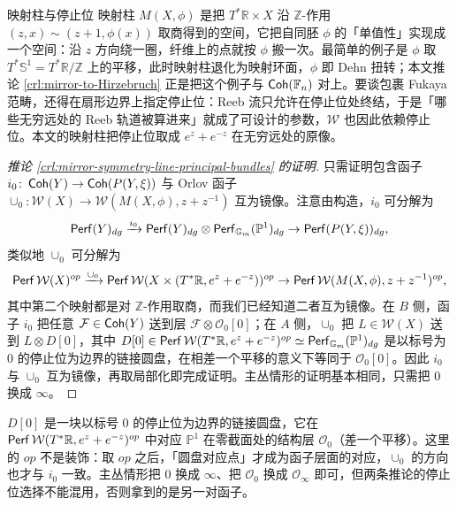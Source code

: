 \begin{conceptbox}{映射柱与停止位}
映射柱 $M(X,\phi)$ 是把 $T^{\ast}\mathbb{R}\times X$ 沿 $\mathbb{Z}$-作用 $(z,x)\sim(z+1,\phi (x))$ 取商得到的空间，它把自同胚 $\phi$ 的「单值性」实现成一个空间：沿 $z$ 方向绕一圈，纤维上的点就按 $\phi$ 搬一次。最简单的例子是 $\phi$ 取 $T^{\ast}\mathbb{S}^1=T^{\ast}\mathbb{R}/\mathbb{Z}$ 上的平移，此时映射柱退化为映射环面，$\phi$ 即 Dehn 扭转；本文推论 \ref{crl:mirror-to-Hirzebruch} 正是把这个例子与 $\operatorname{\mathsf{Coh}} (\mathbb{F}_n)$ 对上。要谈包裹 Fukaya 范畴，还得在扇形边界上指定停止位：Reeb 流只允许在停止位处终结，于是「哪些无穷远处的 Reeb 轨道被算进来」就成了可设计的参数，$\mathcal{W}$ 也因此依赖停止位。本文的映射柱把停止位取成 $e^z+e^{-z}$ 在无穷远处的原像。
\par\smallskip{}
\end{conceptbox}

\begin{proof}[推论 \ref{crl:mirror-symmetry-line-principal-bundles} 的证明]
    只需证明包含函子 $i_0\colon\operatorname{\mathsf{Coh}} (Y)\to\operatorname{\mathsf{Coh}} (P(Y,\xi))$ 与 Orlov 函子 $\cup_0\colon\mathcal{W} (X)\to\mathcal{W} (M(X,\phi),z+z^{-1})$ 互为镜像。注意由构造，$i_0$ 可分解为 \[
        \operatorname{\mathsf{Perf}} (Y)_{dg}\xrightarrow{i_0}\operatorname{\mathsf{Perf}} (Y)_{dg}\otimes\operatorname{\mathsf{Perf}}_{\mathbb{G}_m}(\mathbb{P}^1)_{dg}\to\operatorname{\mathsf{Perf}} (P(Y,\xi))_{dg},
    \]类似地 $\cup_0$ 可分解为 \[
        \operatorname{\mathsf{Perf}}\mathcal{W} (X)^{op}\xrightarrow{\cup_0}\operatorname{\mathsf{Perf}}\mathcal{W} (X\times (T^{\ast}\mathbb{R},e^z+e^{-z}))^{op}\to\operatorname{\mathsf{Perf}}\mathcal{W} (M(X,\phi),z+z^{-1})^{op},
    \]其中第二个映射都是对 $\mathbb{Z}$-作用取商，而我们已经知道二者互为镜像。在 $B$ 侧，函子 $i_0$ 把任意 $\mathcal{F}\in\operatorname{\mathsf{Coh}} (Y)$ 送到层 $\mathcal{F}\otimes\mathcal{O}_0 [0]$；在 $A$ 侧，$\cup_0$ 把 $L\in\mathcal{W} (X)$ 送到 $L\otimes D[0]$，其中 $D[0]\in\operatorname{\mathsf{Perf}}\mathcal{W} (T^{\ast}\mathbb{R},e^z+e^{-z})^{op}\simeq\operatorname{\mathsf{Perf}}_{\mathbb{G}_m} (\mathbb{P}^1)_{dg}$ 是以标号为 $0$ 的停止位为边界的链接圆盘，在相差一个平移的意义下等同于 $\mathcal{O}_0 [0]$。因此 $i_0$ 与 $\cup_0$ 互为镜像，再取局部化即完成证明。主丛情形的证明基本相同，只需把 $0$ 换成 $\infty$。
\end{proof}

\begin{yizhu}
$D[0]$ 是一块以标号 $0$ 的停止位为边界的链接圆盘，它在 $\operatorname{\mathsf{Perf}}\mathcal{W}(T^{\ast}\mathbb{R},e^z+e^{-z})^{op}$ 中对应 $\mathbb{P}^1$ 在零截面处的结构层 $\mathcal{O}_0$（差一个平移）。这里的 $op$ 不是装饰：取 $op$ 之后，「圆盘对应点」才成为函子层面的对应，$\cup_0$ 的方向也才与 $i_0$ 一致。主丛情形把 $0$ 换成 $\infty$、把 $\mathcal{O}_0$ 换成 $\mathcal{O}_\infty$ 即可，但两条推论的停止位选择不能混用，否则拿到的是另一对函子。
\end{yizhu}

